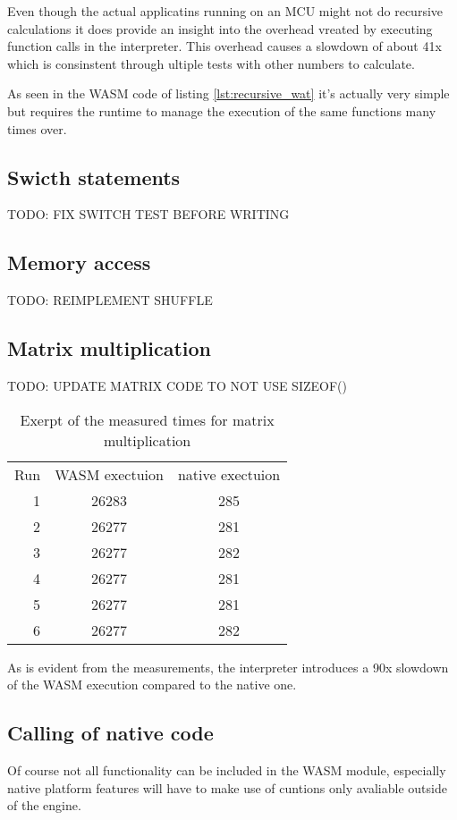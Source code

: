 Even though the actual applicatins running on an MCU might not do recursive calculations it does provide an insight into the overhead vreated by executing function calls in the interpreter. This overhead causes a slowdown of about 41x which is consinstent through ultiple tests with other numbers to calculate.

As seen in the WASM code of listing \ref{lst:recursive_wat} it's actually very simple but requires the runtime to manage the execution of the same functions many times over.
\subsection{Swicth statements}
TODO: FIX SWITCH TEST BEFORE WRITING
\subsection{Memory access}
TODO: REIMPLEMENT SHUFFLE
\subsection{Matrix multiplication}
TODO: UPDATE MATRIX CODE TO NOT USE SIZEOF()
\begin{table}
    \begin{tabular}{rcc}
        Run & WASM exectuion & native exectuion \\
        1 & 26283 & 285 \\
        2 & 26277 & 281 \\
        3 & 26277 & 282 \\
        4 & 26277 & 281 \\
        5 & 26277 & 281 \\
        6 & 26277 & 282 \\
    \end{tabular}
    \caption{Exerpt of the measured times for matrix multiplication}
\end{table}
As is evident from the measurements, the interpreter introduces a 90x slowdown of the WASM execution compared to the native one.
\subsection{Calling of native code}
Of course not all functionality can be included in the WASM module, especially native platform features will have to make use of cuntions only avaliable outside of the engine.

